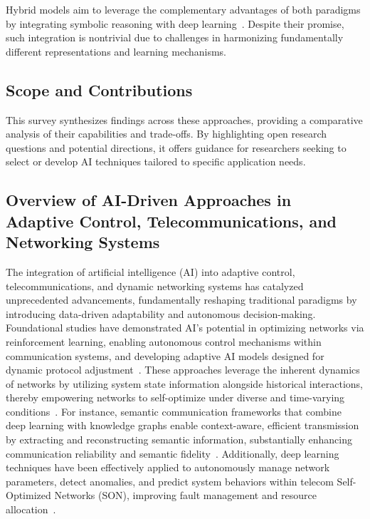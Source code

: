 \documentclass[sigconf]{acmart}
\begin{document}
Hybrid models aim to leverage the complementary advantages of both paradigms by integrating symbolic reasoning with deep learning~\cite{chen2022hybrid}. Despite their promise, such integration is nontrivial due to challenges in harmonizing fundamentally different representations and learning mechanisms.

\subsection{Scope and Contributions}

This survey synthesizes findings across these approaches, providing a comparative analysis of their capabilities and trade-offs. By highlighting open research questions and potential directions, it offers guidance for researchers seeking to select or develop AI techniques tailored to specific application needs.

\subsection{Overview of AI-Driven Approaches in Adaptive Control, Telecommunications, and Networking Systems}

The integration of artificial intelligence (AI) into adaptive control, telecommunications, and dynamic networking systems has catalyzed unprecedented advancements, fundamentally reshaping traditional paradigms by introducing data-driven adaptability and autonomous decision-making. Foundational studies have demonstrated AI's potential in optimizing networks via reinforcement learning, enabling autonomous control mechanisms within communication systems, and developing adaptive AI models designed for dynamic protocol adjustment~\cite{ref17,ref18,ref19,ref20}. These approaches leverage the inherent dynamics of networks by utilizing system state information alongside historical interactions, thereby empowering networks to self-optimize under diverse and time-varying conditions~\cite{ref1,ref2,ref3}. For instance, semantic communication frameworks that combine deep learning with knowledge graphs enable context-aware, efficient transmission by extracting and reconstructing semantic information, substantially enhancing communication reliability and semantic fidelity~\cite{ref1}. Additionally, deep learning techniques have been effectively applied to autonomously manage network parameters, detect anomalies, and predict system behaviors within telecom Self-Optimized Networks (SON), improving fault management and resource allocation~\cite{ref2}.
\end{document}
